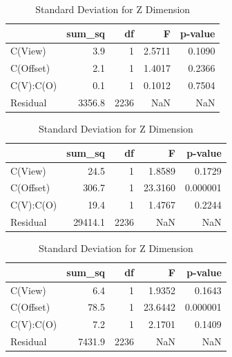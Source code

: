 \begin{table}[ht]
    \centering
    \tiny
    \begin{minipage}{.32\linewidth}
      \centering
      \caption{Standard Deviation for X Dimension}
      \label{tab:x-std}
      \begin{tabular}{@{}lrrrr@{}}
        \toprule
        & \textbf{sum\_sq} & \textbf{df} & \textbf{F} & \textbf{p-value} \\
        \midrule
        C(View)          & 3.9 & 1 & 2.5711 & 0.1090 \\
        C(Offset)        & 2.1 & 1 & 1.4017 & 0.2366 \\
        C(V):C(O) & 0.1 & 1 & 0.1012 & 0.7504 \\
        Residual         & 3356.8 & 2236 & NaN & NaN \\
        \bottomrule
      \end{tabular}
    \end{minipage}%
    \hfill
    \begin{minipage}{.32\linewidth}
      \centering
      \caption{Standard Deviation for Y Dimension}
      \label{tab:y-std}
      \begin{tabular}{@{}lrrrr@{}}
        \toprule
        & \textbf{sum\_sq} & \textbf{df} & \textbf{F} & \textbf{p-value} \\
        \midrule
        C(View)          & 24.5 & 1 & 1.8589 & 0.1729 \\
        C(Offset)        & 306.7 & 1 & 23.3160 & 0.000001 \\
        C(V):C(O) & 19.4 & 1 & 1.4767 & 0.2244 \\
        Residual         & 29414.1 & 2236 & NaN & NaN \\
        \bottomrule
      \end{tabular}
    \end{minipage}%
    \hfill
    \begin{minipage}{.32\linewidth}
      \centering
      \caption{Standard Deviation for Z Dimension}
      \label{tab:z-std}
      \begin{tabular}{@{}lrrrr@{}}
        \toprule
        & \textbf{sum\_sq} & \textbf{df} & \textbf{F} & \textbf{p-value} \\
        \midrule
        C(View)          & 6.4 & 1 & 1.9352 & 0.1643 \\
        C(Offset)        & 78.5 & 1 & 23.6442 & 0.000001 \\
        C(V):C(O) & 7.2 & 1 & 2.1701 & 0.1409 \\
        Residual         & 7431.9 & 2236 & NaN & NaN \\
        \bottomrule
      \end{tabular}
    \end{minipage}%
\end{table}
